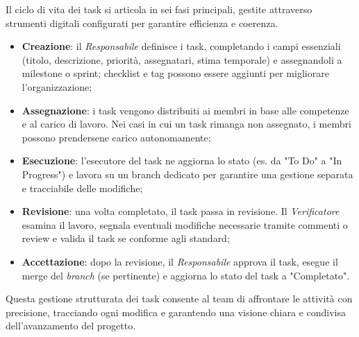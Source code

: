 Il ciclo di vita dei task si articola in sei fasi principali, gestite attraverso strumenti digitali configurati per garantire efficienza e coerenza.
\begin{itemize}
    \item \textbf{Creazione}: il \emph{Responsabile} definisce i task, completando i campi essenziali (titolo, descrizione, priorità, assegnatari, stima temporale) e assegnandoli a milestone o sprint; checklist e tag possono essere aggiunti per migliorare l’organizzazione;
    \item \textbf{Assegnazione}: i task vengono distribuiti ai membri in base alle competenze e al carico di lavoro. Nei casi in cui un task rimanga non assegnato, i membri possono prendersene carico autonomamente;
    \item \textbf{Esecuzione}: l’esecutore del task ne aggiorna lo stato (es. da "To Do" a "In Progress") e lavora su un branch dedicato per garantire una gestione separata e tracciabile delle modifiche;
    \item \textbf{Revisione}: una volta completato, il task passa in revisione. Il \emph{Verificatore} esamina il lavoro, segnala eventuali modifiche necessarie tramite commenti o review e valida il task se conforme agli standard;
    \item \textbf{Accettazione}: dopo la revisione, il \emph{Responsabile} approva il task, esegue il merge del \emph{branch} (se pertinente) e aggiorna lo stato del task a "Completato".
\end{itemize}    
Questa gestione strutturata dei task consente al team di affrontare le attività con precisione, tracciando ogni modifica e garantendo una visione chiara e condivisa dell’avanzamento del progetto.

